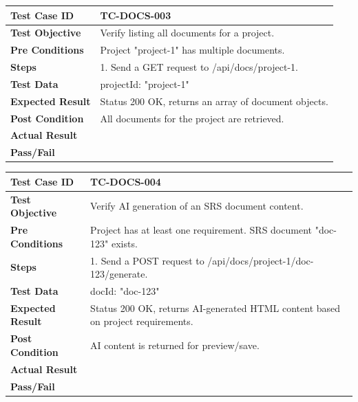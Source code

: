 \begin{longtable}{|p{}|p{}|}
\hline
\textbf{Test Case ID} & TC-DOCS-003 \\ \hline
\textbf{Test Objective} & Verify listing all documents for a project. \\ \hline
\textbf{Pre Conditions} & Project "project-1" has multiple documents. \\ \hline
\textbf{Steps} & 
1. Send a GET request to /api/docs/project-1. \\ \hline
\textbf{Test Data} & projectId: "project-1" \\ \hline
\textbf{Expected Result} & Status 200 OK, returns an array of document objects. \\ \hline
\textbf{Post Condition} & All documents for the project are retrieved. \\ \hline
\textbf{Actual Result} &  \\ \hline
\textbf{Pass/Fail} &  \\ \hline
\end{longtable}

\begin{longtable}{|p{}|p{}|}
\hline
\textbf{Test Case ID} & TC-DOCS-004 \\ \hline
\textbf{Test Objective} & Verify AI generation of an SRS document content. \\ \hline
\textbf{Pre Conditions} & Project has at least one requirement. SRS document "doc-123" exists. \\ \hline
\textbf{Steps} & 
1. Send a POST request to /api/docs/project-1/doc-123/generate. \\ \hline
\textbf{Test Data} & docId: "doc-123" \\ \hline
\textbf{Expected Result} & Status 200 OK, returns AI-generated HTML content based on project requirements. \\ \hline
\textbf{Post Condition} & AI content is returned for preview/save. \\ \hline
\textbf{Actual Result} &  \\ \hline
\textbf{Pass/Fail} &  \\ \hline
\end{longtable}

